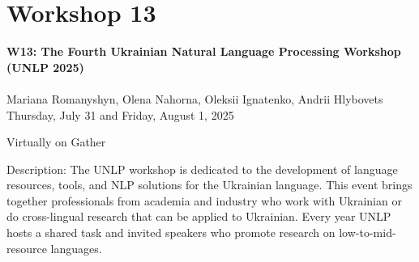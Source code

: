 \clearpage



\section[W13: The Fourth Ukrainian Natural Language Processing Workshop (UNLP 2025)]{Workshop 13}
\label{workshop_13_1}
\label{workshop_13_2}

\begin{center}
    {\Large \textbf{W13: The Fourth Ukrainian Natural Language Processing Workshop (UNLP 2025)}}\\
\\

    Mariana Romanyshyn, Olena Nahorna, Oleksii Ignatenko, Andrii Hlybovets\\
    
    Thursday, July 31 and Friday, August 1, 2025
    
    Virtually on Gather

\end{center}

Description: The UNLP workshop is dedicated to the development of language resources, tools, and NLP solutions for the Ukrainian language. This event brings together professionals from academia and industry who work with Ukrainian or do cross-lingual research that can be applied to Ukrainian. Every year UNLP hosts a shared task and invited speakers who promote research on low-to-mid-resource languages.

